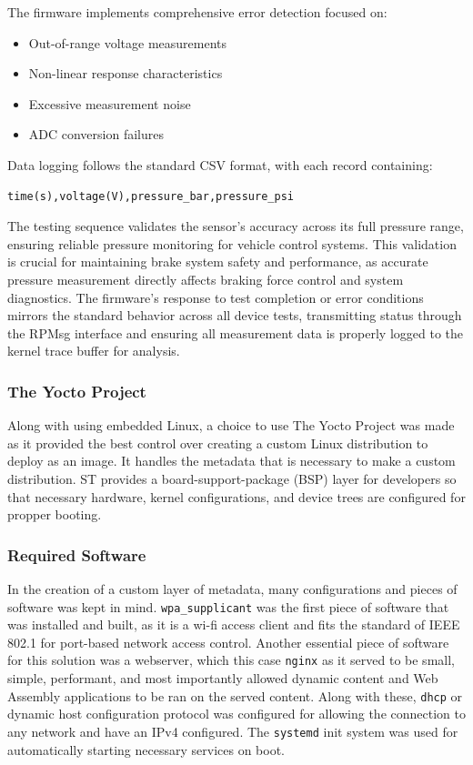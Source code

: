 \documentclass[12pt]{article}
\begin{document}
The firmware implements comprehensive error detection focused on:
\begin{itemize}
\item Out-of-range voltage measurements
\item Non-linear response characteristics
\item Excessive measurement noise
\item ADC conversion failures
\end{itemize}
Data logging follows the standard CSV format, with each record containing:
\begin{verbatim}
time(s),voltage(V),pressure_bar,pressure_psi
\end{verbatim}
The testing sequence validates the sensor's accuracy across its full pressure range, ensuring reliable pressure monitoring for vehicle control systems. This validation is crucial for maintaining brake system safety and performance, as accurate pressure measurement directly affects braking force control and system diagnostics.
The firmware's response to test completion or error conditions mirrors the standard behavior across all device tests, transmitting status through the RPMsg interface and ensuring all measurement data is properly logged to the kernel trace buffer for analysis.



\subsubsection{The Yocto Project}
Along with using embedded Linux, a choice to use The Yocto Project was made
as it provided the best control over creating a custom Linux distribution to
deploy as an image. It handles the metadata that is necessary to make a custom
distribution. ST provides a board-support-package (BSP) layer for developers 
so that necessary hardware, kernel configurations, and device trees are configured
for propper booting.

\subsubsection{Required Software}
In the creation of a custom layer of metadata, many configurations and pieces of software was kept in mind.
\verb+wpa_supplicant+ was the first piece of software that was installed and built, as it is a wi-fi access client
and fits the standard of IEEE 802.1 for port-based network access control. Another essential piece of software
for this solution was a webserver, which this case \verb+nginx+ as it served to be small, simple, performant, and most importantly
allowed dynamic content and Web Assembly applications to be ran on the served content. Along with these, \verb+dhcp+ or 
dynamic host configuration protocol was configured for allowing the connection to any network and have an IPv4 configured.
The \verb+systemd+ init system was used for automatically starting necessary services on boot.
\end{document}
